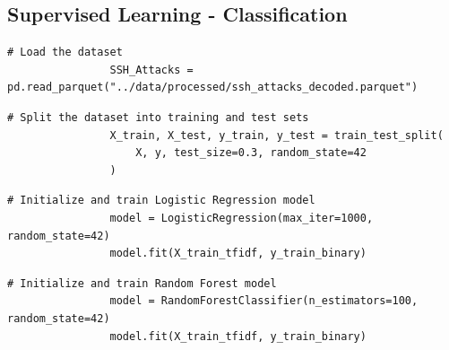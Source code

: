            \vspace{0.5em}

        \subsection{Supervised Learning - Classification}
        
            \vspace{0.5em}

            \begin{lstlisting}[caption={Load the dataset}, label={lst:load_dataset}]
                # Load the dataset
                SSH_Attacks = pd.read_parquet("../data/processed/ssh_attacks_decoded.parquet")
            \end{lstlisting}
            
            \vspace{0.5em}
            
            \begin{lstlisting}[caption={Split the dataset into training and test sets}, label={lst:split_dataset}]
                # Split the dataset into training and test sets
                X_train, X_test, y_train, y_test = train_test_split(
                    X, y, test_size=0.3, random_state=42
                )
            \end{lstlisting}
            
            \vspace{0.5em}
            
            \begin{lstlisting}[caption={Train Logistic Regression model}, label={lst:logistic_regression}]
                # Initialize and train Logistic Regression model
                model = LogisticRegression(max_iter=1000, random_state=42)
                model.fit(X_train_tfidf, y_train_binary)
            \end{lstlisting}
            
            \vspace{0.5em}
            
            \begin{lstlisting}[caption={Train Random Forest model}, label={lst:random_forest}]
                # Initialize and train Random Forest model
                model = RandomForestClassifier(n_estimators=100, random_state=42)
                model.fit(X_train_tfidf, y_train_binary)
            \end{lstlisting}
            
